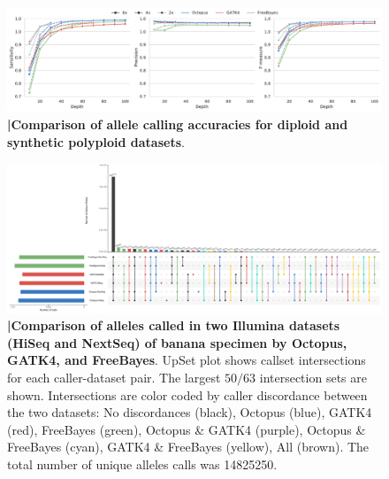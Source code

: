 \documentclass{article}
\begin{document}
\clearpage

\begin{figure}[ht!]
    \centering
    \includegraphics[width=\textwidth]{figures/accuracies-by-depth-alleles}
    \caption{\textbf{|\:Comparison of allele calling accuracies for diploid and synthetic polyploid datasets}.}
    \label{supfig:accuracies-by-depth-alleles}
\end{figure}

\clearpage

\begin{figure}[ht!]
    \centering
    \includegraphics[width=\textwidth]{figures/banana_intersections_alleles}
    \caption{\textbf{|\:Comparison of alleles called in two Illumina datasets (HiSeq and NextSeq) of banana specimen by Octopus, GATK4, and FreeBayes}. UpSet plot shows callset intersections for each caller-dataset pair. The largest $50/63$ intersection sets are shown. Intersections are color coded by caller discordance between the two datasets: No discordances (black), Octopus (blue), GATK4 (red), FreeBayes (green), Octopus \& GATK4 (purple), Octopus \& FreeBayes (cyan), GATK4 \& FreeBayes (yellow), All (brown). The total number of unique alleles calls was \num[group-separator={,}]{14825250}.}
    \label{supfig:banana_intersections_alleles}
\end{figure}

%

%
%
\end{document}
